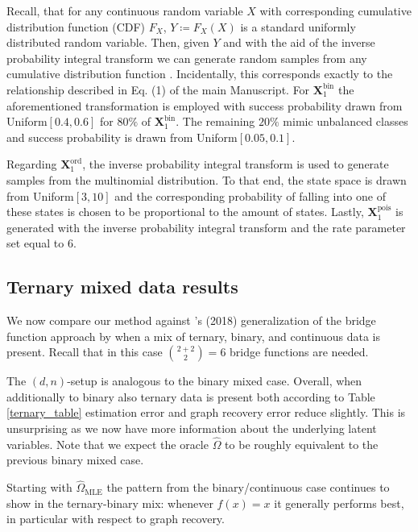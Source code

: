 Recall, that for any continuous random variable $X$ with corresponding cumulative distribution function (CDF) $F_X$, $Y \coloneqq F_X(X)$ is a standard uniformly distributed random variable. Then, given $Y$ and with the aid of the inverse probability integral transform we can generate random samples from any cumulative distribution function \citep{Angus94}. Incidentally, this corresponds exactly to the relationship described in Eq. (1) of the main Manuscript.
For $\boldsymbol{X}_1^{\text{bin}}$ the aforementioned transformation is employed with success probability drawn from Uniform$[0.4,0.6]$ for $80\%$ of $\boldsymbol{X}_1^{\text{bin}}$. The remaining $20\%$ mimic unbalanced classes and success probability is drawn from Uniform$[0.05,0.1]$.

Regarding $\boldsymbol{X}_1^{\text{ord}}$, the inverse probability integral transform is used to generate samples from the multinomial distribution. To that end, the state space is drawn from Uniform$[3,10]$ and the corresponding probability of falling into one of these states is chosen to be proportional to the amount of states. Lastly, $\boldsymbol{X}_1^{\text{pois}}$ is generated with the inverse probability integral transform and the rate parameter set equal to $6$.

\subsection{Ternary mixed data results}

We now compare our method against \citeauthor{Quan18}'s (2018) generalization of the bridge function approach by \citet{Fan17} when a mix of ternary, binary, and continuous data is present. Recall that in this case $ \binom{2+2}{2} = 6$ bridge functions are needed.

The $(d,n)$-setup is analogous to the binary mixed case. Overall, when additionally to binary also ternary data is present both according to Table \ref{ternary_table} estimation error and graph recovery error reduce slightly. This is unsurprising as we now have more information about the underlying latent variables. Note that we expect the oracle $\hat{\Omega}$ to be roughly equivalent to the previous binary mixed case.

Starting with $\hat{\Omega}_{\text{MLE}}$ the pattern from the binary/continuous case continues to show in the ternary-binary mix: whenever $f(x)=x$ it generally performs best, in particular with respect to graph recovery.

